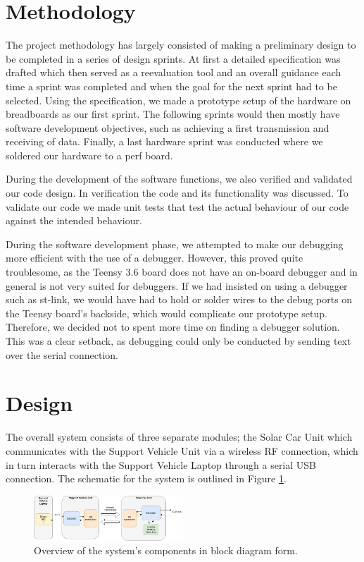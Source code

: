 \documentclass[conference]{IEEEtran}
\begin{document}
\section{Methodology}
The project methodology has largely consisted of making a preliminary design to be completed in a series of design sprints. At first a detailed specification was drafted which then served as a reevaluation tool and an overall guidance each time a sprint was completed and when the goal for the next sprint had to be selected. Using the specification, we made a prototype setup of the hardware on breadboards as our first sprint. The following sprints would then mostly have software development objectives, such as achieving a first transmission and receiving of data. Finally, a last hardware sprint was conducted where we soldered our hardware to a perf board.

During the development of the software functions, we also verified and validated our code design. In verification the code and its functionality was discussed. To validate our code we made unit tests that test the actual behaviour of our code against the intended behaviour.

During the software development phase, we attempted to make our debugging more efficient with the use of a debugger. However, this proved quite troublesome, as the Teensy 3.6 board does not have an on-board debugger and in general is not very suited for debuggers. If we had insisted on using a debugger such as st-link, we would have had to hold or solder wires to the debug ports on the Teensy board's backside, which would complicate our prototype setup. Therefore, we decided not to spent more time on finding a debugger solution. This was a clear setback, as debugging could only be conducted by sending text over the serial connection.

\section{Design}
The overall system consists of three separate modules; the Solar Car Unit which communicates with the Support Vehicle Unit via a wireless RF connection, which in turn interacts with the Support Vehicle Laptop through a serial USB connection. The schematic for the system is outlined in Figure \ref{fig:schematic}. 
\begin{figure}[H]
    \centering
    \includegraphics[width=0.5\textwidth]{documentation/images/schematic.png}
    \caption{Overview of the system's components in block diagram form.}
    \label{fig:schematic}
\end{figure}
\end{document}
